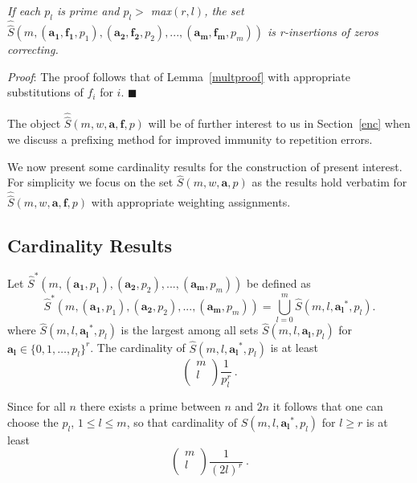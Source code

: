\begin{lemma}\label{multproof2}\textit{If each $p_l$ is prime and $p_l >$
max$(r,l)$, the set
\newline \noindent$\hat{\hat{S}}\left(m,(\mathbf{a_1},\mathbf{f_1},
p_1),(\mathbf{a_2},\mathbf{f_2},
p_2),...,(\mathbf{a_m},\mathbf{f_m}, p_m)\right)$ is r-insertions of
zeros correcting.}\end{lemma}

\textit{Proof}: The proof follows that of Lemma~\ref{multproof} with
appropriate substitutions of $f_i$ for $i$. \hfill$\blacksquare$

The object $\hat{\hat{S}}(m,w,\mathbf{a},\mathbf{f}, p)$ will be of
further interest to us in Section~\ref{enc}  when we discuss a
prefixing method for improved immunity to repetition errors.

We now present some cardinality results for the construction of
present interest. For simplicity we focus on the set
$\hat{S}(m,w,\mathbf{a},p)$ as the results hold verbatim for
$\hat{\hat{S}}(m,w,\mathbf{a},\mathbf{f}, p)$ with appropriate
weighting assignments.
\subsection{Cardinality Results}

 Let
$\hat{S}^*\left(m,(\mathbf{a_1},p_1),(\mathbf{a_2},p_2),...,(\mathbf{a_m},p_m)\right)$
be defined as
\begin{equation}\label{union}\hat{S}^*\left(m,(\mathbf{a_1},p_1),(\mathbf{a_2},p_2),...,(\mathbf{a_m},p_m)\right)=
\bigcup_{l=0}^{m} \hat{S}(m,l,\mathbf{a_l}^*,p_l).\end{equation}
where $\hat{S}(m,l,\mathbf{a_l}^*,p_l)$ is the largest among all
sets $\hat{S}(m,l,\mathbf{a_l},p_l)$ for $\mathbf{a_l} \in
\{0,1,\dots,p_l\}^r$. The cardinality of
$\hat{S}(m,l,\mathbf{a_l}^*,p_l)$ is at least \[ \left(
\begin{array}{c}
                             m \\
                             l \\
                           \end{array}
                           \right) \frac{1}{p_l^r}~.\]

Since for all $n$ there exists a prime between $n$ and $2n$ it
follows that one can choose the $p_l$, $1 \le l \le m$, so that
cardinality of $\hat{S}(m,l,\mathbf{a_l}^*,p_l)$ for $l\geq r$ is at
least \[ \left(
\begin{array}{c}
                             m \\
                             l \\
                           \end{array}
                           \right) \frac{1}{(2l)^r}~.\]

